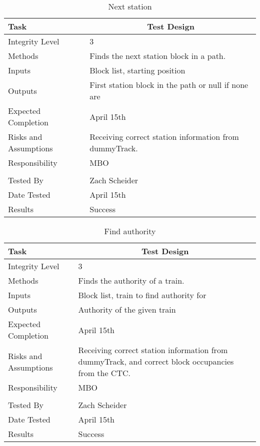 \documentclass[]{article}
\begin{document}
\begin{table}[H]
	\centering
	\caption{Next station}
	\begin{tabular}{|l|l|}
		\hline
		Task & \multicolumn{1}{c|}{Test Design} \\ \hline
		Integrity Level & 3 \\ \hline
		Methods & Finds the next station block in a path. \\ \hline
		Inputs &  Block list, starting position\\ \hline
		Outputs &  First station block in the path or null if none are \\ \hline
		Expected Completion & \parbox[t]{10cm}{April 15th}\\ \hline
		Risks and Assumptions & \parbox[t]{10cm}{Receiving correct station information from dummyTrack.} \\ \hline
		Responsibility & MBO\\ \hline
			\\ \hline
		Tested By   &  Zach Scheider\\	\hline
		Date Tested & \parbox[t]{10cm}{April 15th}\\ \hline
		Results & Success\\ \hline
	\end{tabular}
\end{table}

\begin{table}[H]
	\centering
	\caption{Find authority}
	\begin{tabular}{|l|l|}
		\hline
		Task & \multicolumn{1}{c|}{Test Design} \\ \hline
		Integrity Level & 3 \\ \hline
		Methods & Finds the authority of a train. \\ \hline
		Inputs &  Block list, train to find authority for\\ \hline
		Outputs &  Authority of the given train \\ \hline
		Expected Completion & \parbox[t]{10cm}{April 15th}\\ \hline
		Risks and Assumptions & \parbox[t]{10cm}{Receiving correct station information from dummyTrack, and correct block occupancies from the CTC.} \\ \hline
		Responsibility & MBO\\ \hline
			\\ \hline
		Tested By   &  Zach Scheider\\	\hline
		Date Tested & \parbox[t]{10cm}{April 15th}\\ \hline
		Results & Success\\ \hline
	\end{tabular}
\end{table}
\end{document}
